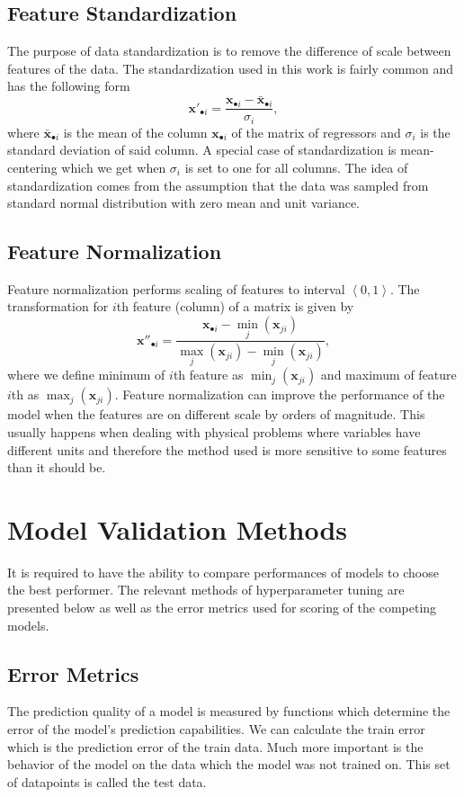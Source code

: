 \documentclass[11pt,oneside,czech,american]{book} %
\theoremstyle{plain}
\theoremstyle{definition}
\begin{document}
\subsection{Feature Standardization}
The purpose of data standardization is to remove the difference of scale between features of the data. The standardization used in this work is fairly common and has the following form
\begin{equation}
	\bm{x'}_{\bullet i} = \frac{\bm{x}_{\bullet i} - \bm{\bar{x}}_{\bullet i}  }{\sigma_i},
\end{equation}
where $\bm{\bar{x}}_{\bullet i}$ is the mean of the column $\bm{x}_{\bullet i}$ of the matrix of regressors and $\sigma_i$ is the standard deviation of said column.  A special case of standardization is mean-centering which we get when $\sigma_i$ is set to one for all columns. The idea of standardization comes from the assumption that the data was sampled from standard normal distribution with zero mean and unit variance.
\subsection{Feature Normalization}
Feature normalization performs scaling of features to interval $\left<0,1\right>$. The transformation for $i$th feature (column) of a matrix is given by
\begin{equation}
		\bm{x''}_{\bullet i} = \frac{\bm{x}_{\bullet i} - \min_{j}(\bm{x}_{j i}) }{\max_{j} (\bm{x}_{j i}) - \min_{j}(\bm{x}_{j i})},
\end{equation}
where we define minimum of $i$th feature as $\min_{j} (\bm{x}_{j i})$ and maximum of feature $i$th as $\max_{j} (\bm{x}_{j i})$. Feature normalization can improve the performance of the model when the features are on different scale by orders of magnitude. This usually happens when dealing with physical problems where variables have different units and therefore the method used is more sensitive to some features than it should be.

\section{Model Validation Methods}
It is required to have the ability to compare performances of models to choose the best performer. The relevant methods of hyperparameter tuning are presented below as well as the error metrics used for scoring of the competing models.

\subsection{Error Metrics}
The prediction quality of a model is measured by functions which determine the error of the model's prediction capabilities. We can calculate the train error which is the prediction error of the train data. Much more important is the behavior of the model on the data which the model was not trained on. This set of datapoints is called the test data.
\end{document}
